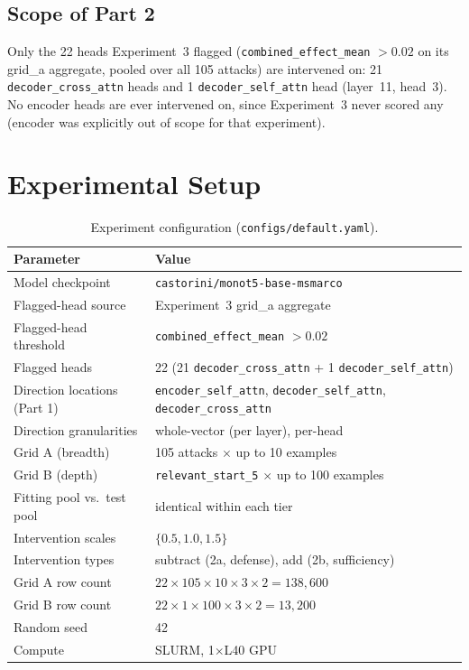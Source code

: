 \documentclass[11pt]{article}
\begin{document}
\subsection{Scope of Part 2}

Only the 22 heads Experiment~3 flagged (\texttt{combined\_effect\_mean}
$>0.02$ on its grid\_a aggregate, pooled over all 105 attacks) are
intervened on: 21 \texttt{decoder\_cross\_attn} heads and 1
\texttt{decoder\_self\_attn} head (layer~11, head~3). No encoder heads are
ever intervened on, since Experiment~3 never scored any (encoder was
explicitly out of scope for that experiment).

\section{Experimental Setup}

\begin{table}[H]
\centering
\caption{Experiment configuration (\texttt{configs/default.yaml}).}
\label{tab:config}
\begin{tabular}{ll}
\toprule
Parameter & Value \\
\midrule
Model checkpoint            & \texttt{castorini/monot5-base-msmarco} \\
Flagged-head source         & Experiment~3 grid\_a aggregate \\
Flagged-head threshold      & \texttt{combined\_effect\_mean} $> 0.02$ \\
Flagged heads                & 22 (21 \texttt{decoder\_cross\_attn} + 1 \texttt{decoder\_self\_attn}) \\
Direction locations (Part 1)& \texttt{encoder\_self\_attn}, \texttt{decoder\_self\_attn}, \texttt{decoder\_cross\_attn} \\
Direction granularities     & whole-vector (per layer), per-head \\
\midrule
Grid A (breadth)            & 105 attacks $\times$ up to 10 examples \\
Grid B (depth)              & \texttt{relevant\_start\_5} $\times$ up to 100 examples \\
Fitting pool vs.\ test pool & identical within each tier \\
\midrule
Intervention scales         & $\{0.5, 1.0, 1.5\}$ \\
Intervention types          & subtract (2a, defense), add (2b, sufficiency) \\
Grid A row count             & $22 \times 105 \times 10 \times 3 \times 2 = 138{,}600$ \\
Grid B row count             & $22 \times 1 \times 100 \times 3 \times 2 = 13{,}200$ \\
\midrule
Random seed                 & 42 \\
Compute                     & SLURM, 1$\times$L40 GPU \\
\bottomrule
\end{tabular}
\end{table}
\end{document}
